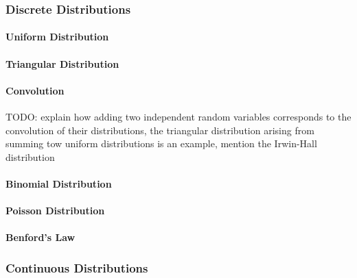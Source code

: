 \subsubsection{Discrete Distributions}

\paragraph{Uniform Distribution}

\paragraph{Triangular Distribution}

\paragraph{Convolution} TODO: explain how adding two independent random variables corresponds to the convolution of their distributions, the triangular distribution arising from summing tow uniform distributions is an example, mention the Irwin-Hall distribution



\paragraph{Binomial Distribution}


\paragraph{Poisson Distribution}


\paragraph{Benford's Law}



\subsubsection{Continuous Distributions}

